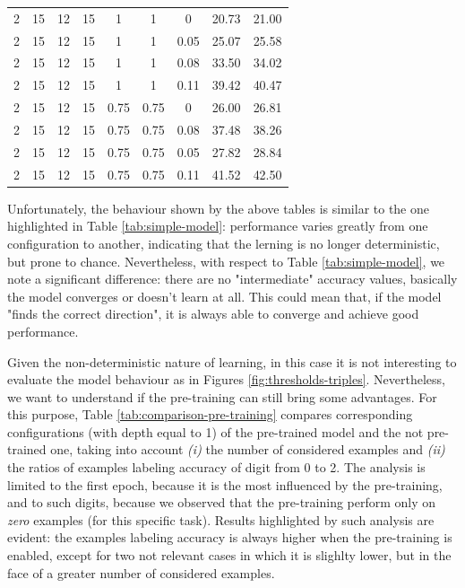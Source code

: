 \begin{table}[H]
\begin{tabular}{cccccccrr}
	2 			& 15     			& 12     		& 15     			& 1 					& 1 					& 0 					& 20.73    				& 21.00\\
	2 			& 15     			& 12     		& 15     			& 1 					& 1 					& 0.05    				& 25.07    				& 25.58\\
	2 			& 15     			& 12     		& 15     			& 1 					& 1 					& 0.08    				& 33.50    				& 34.02\\
	2 			& 15     			& 12     		& 15     			& 1 					& 1 					& 0.11    				& 39.42    				& 40.47\\
	2 			& 15     			& 12     		& 15     			& 0.75    				& 0.75    				& 0 					& 26.00    	 			& 26.81\\
	2 			& 15     			& 12     		& 15     			& 0.75    				& 0.75    				& 0.08    				& 37.48    				& 38.26\\
	2 			& 15     			& 12     		& 15     			& 0.75    				& 0.75    				& 0.05    				& 27.82    				& 28.84\\
	2 			& 15     			& 12     		& 15     			& 0.75    				& 0.75    				& 0.11    				& 41.52    				& 42.50\\
    \bottomrule
  \end{tabular}
\end{table}
Unfortunately, the behaviour shown by the above tables is similar to the one highlighted in Table \ref{tab:simple-model}: performance varies greatly from one configuration to another, indicating that the lerning is no longer deterministic, but prone to chance. Nevertheless, with respect to Table \ref{tab:simple-model}, we note a significant difference: there are no "intermediate" accuracy values, basically the model converges or doesn't learn at all. This could mean that, if the model "finds the correct direction", it is always able to converge and achieve good performance.

Given the non-deterministic nature of learning, in this case it is not interesting to evaluate the model behaviour as in Figures \ref{fig:thresholds-triples}. Nevertheless, we want to understand if the pre-training can still bring some advantages. For this purpose, Table \ref{tab:comparison-pre-training} compares corresponding configurations (with depth equal to 1) of the pre-trained model and the not pre-trained one, taking into account \textit{(i)} the number of considered examples and \textit{(ii)} the ratios of examples labeling accuracy of digit from 0 to 2. The analysis is limited to the first epoch, because it is the most influenced by the pre-training, and to such digits, because we observed that the pre-training perform only on \textit{zero} examples (for this specific task). Results highlighted by such analysis are evident: the examples labeling accuracy is always higher when the pre-training is enabled, except for two not relevant cases in which it is slighlty lower, but in the face of a greater number of considered examples.

